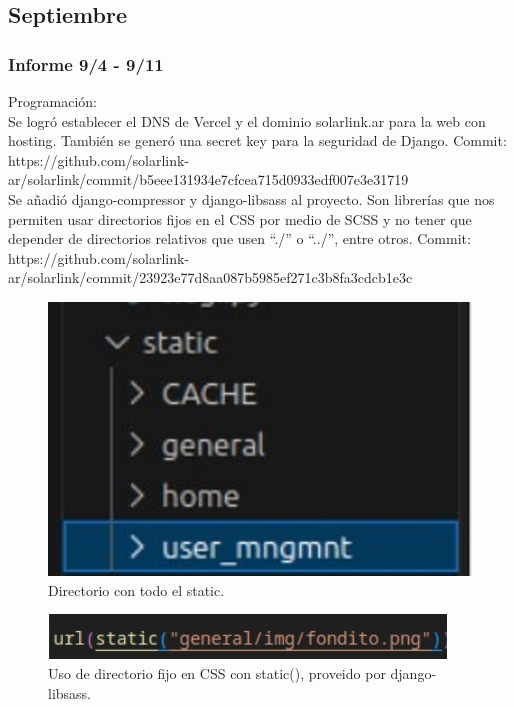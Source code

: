 \subsection{Septiembre}

\subsubsection{Informe 9/4 - 9/11}

Programación:\\

Se logró establecer el DNS de Vercel y el dominio solarlink.ar para la web con hosting. También se generó una secret key para la seguridad de Django. Commit:\\
https://github.com/solarlink-\\ar/solarlink/commit/b5eee131934e7cfcea715d0933edf007e3e31719\\

Se añadió django-compressor y django-libsass al proyecto. Son librerías que nos permiten usar directorios fijos en el CSS por medio de SCSS y no tener que depender de directorios relativos que usen “./” o “../”, entre otros. Commit:\\
https://github.com/solarlink-\\ar/solarlink/commit/23923e77d8aa087b5985ef271c3b8fa3cdcb1e3c

\begin{figure}[H]
    \centering
    \includegraphics[width=0.5\linewidth]{informes/Screenshot_20.jpg}
    \caption{Directorio con todo el static.}
\end{figure}

\begin{figure}[H]
    \centering
    \includegraphics[width=0.75\linewidth]{informes/Screenshot_29.jpg}
    \caption{Uso de directorio fijo en CSS con static(), proveido por django-libsass.}
\end{figure}

